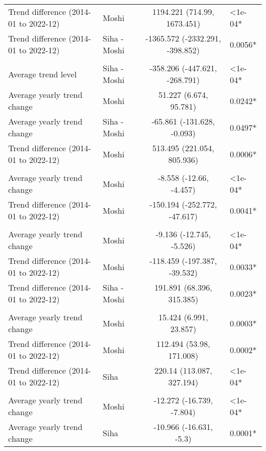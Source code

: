\begin{longtable}{l|lcl}
Trend difference (2014-01 to 2022-12) & Moshi & 1194.221 (714.99, 1673.451) & <1e-04* \\ 
Trend difference (2014-01 to 2022-12) & Siha - Moshi & -1365.572 (-2332.291, -398.852) & 0.0056* \\ 
\midrule\addlinespace[2.5pt]
\multicolumn{4}{l}{Urinary Tract Infections} \\ 
\midrule\addlinespace[2.5pt]
Average trend level & Siha - Moshi & -358.206 (-447.621, -268.791) & <1e-04* \\ 
Average yearly trend change & Moshi & 51.227 (6.674, 95.781) & 0.0242* \\ 
Average yearly trend change & Siha - Moshi & -65.861 (-131.628, -0.093) & 0.0497* \\ 
Trend difference (2014-01 to 2022-12) & Moshi & 513.495 (221.054, 805.936) & 0.0006* \\ 
\midrule\addlinespace[2.5pt]
\multicolumn{4}{l}{Caries} \\ 
\midrule\addlinespace[2.5pt]
Average yearly trend change & Moshi & -8.558 (-12.66, -4.457) & <1e-04* \\ 
Trend difference (2014-01 to 2022-12) & Moshi & -150.194 (-252.772, -47.617) & 0.0041* \\ 
\midrule\addlinespace[2.5pt]
\multicolumn{4}{l}{Dysentery} \\ 
\midrule\addlinespace[2.5pt]
Average yearly trend change & Moshi & -9.136 (-12.745, -5.526) & <1e-04* \\ 
Trend difference (2014-01 to 2022-12) & Moshi & -118.459 (-197.387, -39.532) & 0.0033* \\ 
Trend difference (2014-01 to 2022-12) & Siha - Moshi & 191.891 (68.396, 315.385) & 0.0023* \\ 
\midrule\addlinespace[2.5pt]
\multicolumn{4}{l}{Peptic Ulcers} \\ 
\midrule\addlinespace[2.5pt]
Average yearly trend change & Moshi & 15.424 (6.991, 23.857) & 0.0003* \\ 
Trend difference (2014-01 to 2022-12) & Moshi & 112.494 (53.98, 171.008) & 0.0002* \\ 
Trend difference (2014-01 to 2022-12) & Siha & 220.14 (113.087, 327.194) & <1e-04* \\ 
\midrule\addlinespace[2.5pt]
\multicolumn{4}{l}{Malnutrition} \\ 
\midrule\addlinespace[2.5pt]
Average yearly trend change & Moshi & -12.272 (-16.739, -7.804) & <1e-04* \\ 
Average yearly trend change & Siha & -10.966 (-16.631, -5.3) & 0.0001* \\ 

\end{longtable}
